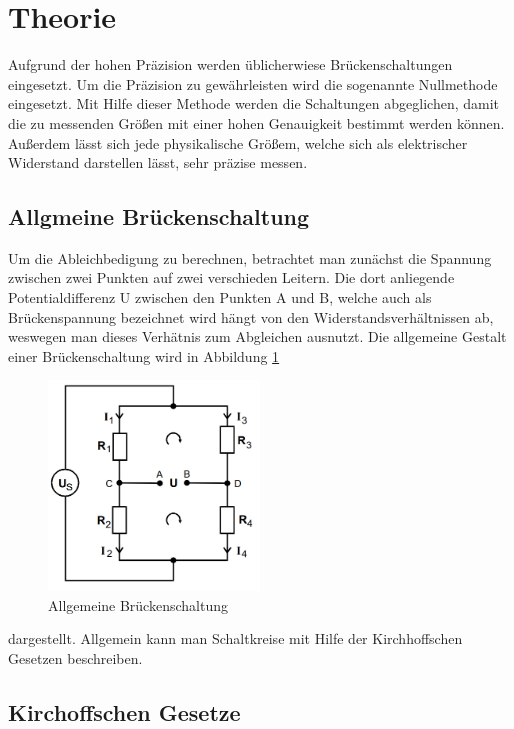\section{Theorie}
\label{sec:Theorie}
Aufgrund der hohen Präzision werden üblicherwiese Brückenschaltungen eingesetzt. Um die Präzision zu gewährleisten wird die sogenannte Nullmethode eingesetzt.
Mit Hilfe dieser Methode werden die Schaltungen abgeglichen, damit die zu messenden Größen mit einer hohen Genauigkeit bestimmt werden können. Außerdem lässt sich jede
physikalische Größem, welche sich als elektrischer Widerstand darstellen lässt, sehr präzise messen.
\subsection{Allgmeine Brückenschaltung}
Um die Ableichbedigung zu berechnen, betrachtet man zunächst die Spannung zwischen zwei Punkten auf zwei verschieden Leitern. Die dort anliegende Potentialdifferenz U
zwischen den Punkten A und B, welche auch als Brückenspannung bezeichnet wird hängt von den Widerstandsverhältnissen ab,
weswegen man dieses Verhätnis zum Abgleichen ausnutzt.
Die allgemeine Gestalt einer Brückenschaltung wird in  Abbildung \ref{fig:allgBrücke}
\begin{figure}
    \centering
    \caption{Allgemeine Brückenschaltung} 
    \label{fig:allgBrücke}
    \includegraphics[width = 0.5\textwidth]{bridges/genbridge.png}
\end{figure}
dargestellt. Allgemein kann man Schaltkreise mit Hilfe der Kirchhoffschen Gesetzen beschreiben.
\subsection{Kirchoffschen Gesetze}
